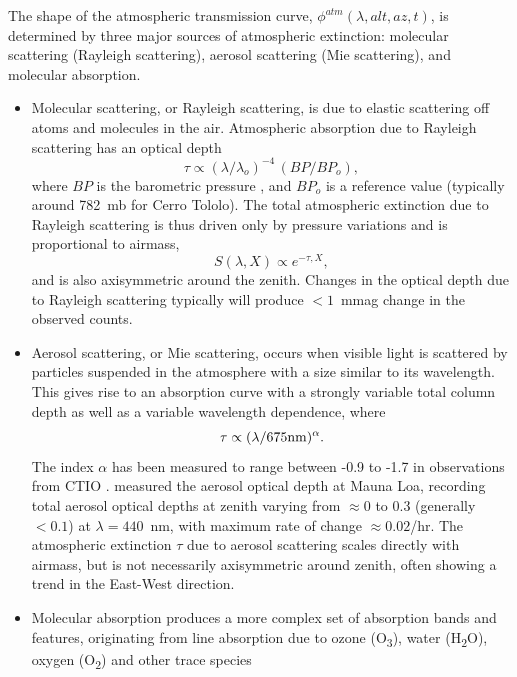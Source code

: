 \documentclass[12pt,preprint]{aastex}
\newcommand{\water}   {H\textsubscript{2}O}
\newcommand{\ozone}    {O\textsubscript{3}}
\newcommand{\oxy}     {O\textsubscript{2}}
\begin{document}
\label{sec:atmo_behavior}
The shape of the atmospheric transmission curve, $\phi^{atm}(\lambda,
alt, az, t)$, is determined by three major sources of atmospheric
extinction: molecular scattering (Rayleigh scattering), aerosol
scattering (Mie scattering), and molecular absorption. 
\begin{itemize}
\item{Molecular scattering, or Rayleigh scattering, is due to elastic
scattering off atoms and molecules in the air. Atmospheric absorption
due to Rayleigh scattering has an optical depth 
\begin{equation}
\tau \propto (\lambda/ \lambda_o)^{-4}\, (BP/BP_o),
\end{equation} 
where $BP$ is the barometric pressure \citep{Hansen1974}, and $BP_o$ is a reference value
(typically around 782~mb for Cerro Tololo).  The total atmospheric
extinction due to Rayleigh scattering is thus driven only by pressure
variations and is proportional to airmass, 
\begin{equation}
S(\lambda,X) \propto e^{-\tau, X},
\end{equation} 
and is also axisymmetric around the zenith. Changes in the
optical depth due to Rayleigh scattering typically will produce
$<1$~mmag change in the observed counts.}
\item{Aerosol scattering, or Mie scattering, occurs when visible light
is scattered by particles suspended in the atmosphere with a size
similar to its wavelength.  This gives rise to an absorption curve
with a strongly variable total column depth as well as a variable wavelength
dependence, where 
\begin{equation}
\tau \propto (\lambda/675 \rm{nm})^{\alpha}.
\end{equation} 
The index $\alpha$ has been measured to range between -0.9 to -1.7 in
observations from CTIO \citep{Burke2010b}.  \citet{Stubbs2007b}
measured the aerosol optical depth at Mauna Loa, recording total aerosol optical
depths at zenith varying from $\approx 0$ to 0.3 (generally $<0.1$) at
$\lambda=440$~nm, with maximum rate of change $\approx0.02$/hr. The
atmospheric extinction $\tau$ due to aerosol scattering scales directly with airmass, but is not
necessarily axisymmetric around zenith, often showing a trend in the
East-West direction. }
\item{Molecular absorption produces a more complex
set of absorption bands and features, originating from line absorption
due to ozone (\ozone), water (\water), oxygen (\oxy) and other trace species
}
\end{itemize}
\end{document}
